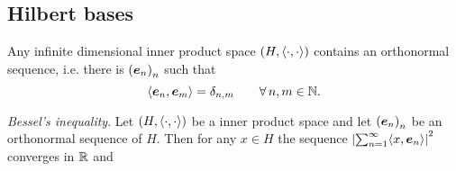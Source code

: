 \documentclass{article}
\begin{document}
\subsection{Hilbert bases}
\begin{proposition}
	Any infinite dimensional inner product space $\left(H,\langle \cdot,\cdot \rangle\right)$ contains an orthonormal sequence, i.e. there is ${\left({\bm{e}}_{n}\right)}_{n}$ such that
	\begin{equation*}
		\langle \bm{e}_{n},\bm{e}_{m} \rangle=\delta_{n,m}\qquad\forall\, n,m\in\mathbb{N}.
	\end{equation*}
\end{proposition}
\begin{lemma}
	\emph{Bessel's inequality}. Let $\left(H,\langle \cdot,\cdot \rangle\right)$ be a inner product space and let ${\left({\bm{e}}_{n}\right)}_{n}$ be an orthonormal sequence of $H$. Then for any $x\in H$ the sequence $\left|\sum_{n=1}^{\infty}\langle x,\bm{e}_{n} \rangle\right|^{2}$ converges in $\mathbb{R}$ and 
\end{lemma}
%
\end{document}
